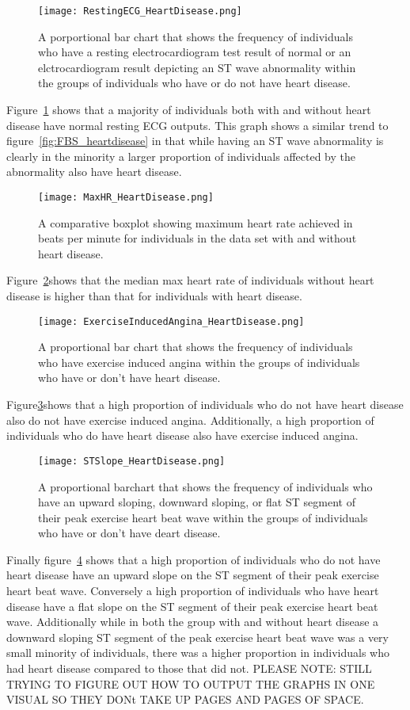 \documentclass[12pt]{article}
\begin{document}
\begin{figure}[tbp]
  \centering
  \texttt{[image: RestingECG\_HeartDisease.png]}
  \caption{A porportional bar chart that shows the frequency of individuals who have a resting electrocardiogram test result of normal or an elctrocardiogram result depicting an ST wave abnormality within the groups of individuals who have or do not have heart disease.}
  \label{fig:ECG_heartdisease}
\end{figure}
Figure~\ref{fig:ECG_heartdisease} shows that a majority of individuals both with and without heart disease have normal resting ECG outputs. This graph shows a similar trend to figure~\ref{fig:FBS_heartdisease} in that while having an ST wave abnormality is clearly in the minority a larger proportion of individuals affected by the abnormality also have heart disease.
\begin{figure}[tbp]
  \centering
  \texttt{[image: MaxHR\_HeartDisease.png]}
  \caption{A comparative boxplot showing maximum heart rate achieved in beats per minute for individuals in the data set with and without heart disease.}
  \label{fig:maxHR_heartdisease}
\end{figure}
Figure~\ref{fig:maxHR_heartdisease}shows that the median max heart rate of individuals without heart disease is higher than that for individuals with heart disease. 
\begin{figure}[tbp]
  \centering
  \texttt{[image: ExerciseInducedAngina\_HeartDisease.png]}
  \caption{A proportional bar chart that shows the frequency of individuals who have exercise induced angina within the groups of individuals who have or don't have heart disease.}
  \label{fig:EIA_heartdisease}
\end{figure}
Figure\ref{fig:EIA_heartdisease}shows that a high proportion of individuals who do not have heart disease also do not have exercise induced angina. Additionally, a high proportion of individuals who do have heart disease also have exercise induced angina. 
\begin{figure}[tbp]
  \centering
  \texttt{[image: STSlope\_HeartDisease.png]}
  \caption{A proportional barchart that shows the frequency of individuals who have an upward sloping, downward sloping, or flat ST segment of their peak exercise heart beat wave within the groups of individuals who have or don't have deart disease.}
  \label{fig:STslope_heartdisease}
\end{figure}
Finally figure~\ref{fig:STslope_heartdisease} shows that a high proportion of individuals who do not have heart disease have an upward slope on the ST segment of their peak exercise heart beat wave. Conversely a high proportion of individuals who have heart disease have a flat slope on the ST segment of their peak exercise heart beat wave. Additionally while in both the group with and without heart disease a downward sloping ST segment of the peak exercise heart beat wave was a very small minority of individuals, there was a higher proportion in individuals who had heart disease compared to those that did not.
PLEASE NOTE: STILL TRYING TO FIGURE OUT HOW TO OUTPUT THE GRAPHS IN ONE VISUAL SO THEY DONt TAKE UP PAGES AND PAGES OF SPACE. 
\end{document}
